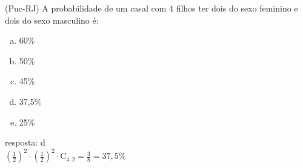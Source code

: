 \begin{ex}
 (Puc-RJ) A probabilidade de um casal com 4 filhos ter dois do sexo feminino e dois do sexo masculino é:
    \begin{enumerate}[(a)]
    \item 60\%
    \item 50\%
    \item 45\%
    \item 37,5\%
    \item 25\%
    \end{enumerate}
      \begin{sol}
      resposta: d  \\
      $(\frac{1}{2})^2\cdot(\frac{1}{2})^2\cdot\mathrm{C}_{4,2}=\frac{3}{8}=37,5\%$
      \end{sol}
\end{ex}